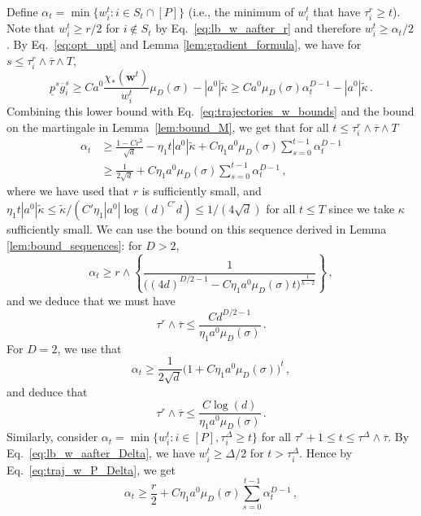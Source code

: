 \documentclass[11pt]{article}
\newcommand{\<}{\langle}
\renewcommand{\>}{\rangle}
\theoremstyle{definition}
\def\bw{{\boldsymbol w}}
\def\bw{{\boldsymbol w}}
\def\og{\overline{g}}
\def\up{\underline{p}}
\def\otau{\overline{\tau}}
\begin{document}
Define $\alpha_t = \min \{ w_i^t : i \in S_t \cap [P]\} $ (i.e., the minimum of $w_i^t$ that have $\tau_i^r \geq t$). Note that $w_i^t \geq r/2$ for $i\not\in S_t$ by Eq.~\eqref{eq:lb_w_aafter_r} and therefore $w_i^t \geq \alpha_t /2$. By Eq.~\eqref{eq:opt_upt} and Lemma \ref{lem:gradient_formula}, we have for $s \leq \tau_i^r \wedge \otau \wedge T$,
\[
\up^s \og_i^s \geq C a^0 \frac{\chi_* (\bw^t)}{w_i^t} \mu_D (\sigma) - |a^0| \tilde{\kappa} \geq C a^0 \mu_D (\sigma) \alpha_t^{D-1} - |a^0| \tilde{\kappa} \, .
\]
Combining this lower bound with Eq.~\eqref{eq:trajectories_w_bounds} and the bound on the martingale in Lemma~\ref{lem:bound_M}, we get that for all $t \leq \tau_i^r \wedge \otau \wedge T$
\begin{equation}\label{eq:lower_bound_alpha}
\begin{aligned}
\alpha_t &\geq \frac{1 - Cr^2}{\sqrt{d}} - \eta_1 t|a^0|\tilde{\kappa} + C \eta_1 a^0\mu_D (\sigma) \sum_{s= 0}^{t-1} \alpha_t^{D - 1} \\
&\geq \frac{1}{2\sqrt{d}} + C \eta_1 a^0\mu_D (\sigma) \sum_{s= 0}^{t-1} \alpha_t^{D - 1}\,,
\end{aligned}
\end{equation}
where we have used that $r$ is sufficiently small, and $\eta_1 t |a^0| \tilde{\kappa} \leq \tilde{\kappa} / (C' \eta_1 |a^0| \log(d)^{C'} d) \leq 1/(4\sqrt{d})$ for all $t \leq T$ since we take $\kappa$ sufficiently small. We can use the bound on this sequence derived in Lemma \ref{lem:bound_sequences}: for $D> 2$,
\[
\alpha_t \geq r \wedge \left\{ \frac{1}{\big( (4d)^{D/2 - 1} - C \eta_1 a^0\mu_D (\sigma) t \big)^{\frac{1}{k-2}} } \right\} \, ,
\]
and we deduce that we must have
\begin{equation*}
\tau^r \wedge \otau \leq \frac{C d^{D/2 -1}}{\eta_1 a^0 \mu_D (\sigma)} \, .
\end{equation*}
For $D= 2$, we use that 
\[
\alpha_t \geq \frac{1}{2\sqrt{d}} \big(1 + C \eta_1 a^0 \mu_D (\sigma) \big)^t \, ,
\]
and deduce that
\begin{equation*}
\tau^r \wedge \otau \leq \frac{C \log (d) }{\eta_1 a^0 \mu_D (\sigma)} \, .
\end{equation*}
Similarly, consider $\alpha_t = \min \{ w_i^t : i \in [P], \tau^{\Delta}_i \geq t \} $ for all $\tau^r +1 \leq t \leq \tau^\Delta \wedge \otau$. By Eq.~\eqref{eq:lb_w_aafter_Delta}, we have $w_i^t \geq \Delta/2$ for $t > \tau_i^\Delta$. Hence by Eq.~\eqref{eq:traj_w_P_Delta}, we get 
\[
\alpha_t \geq \frac{r}{2} + C \eta_1 a^0\mu_D (\sigma) \sum_{s= 0}^{t-1} \alpha_t^{D - 1} \, ,
\]
\end{document}
